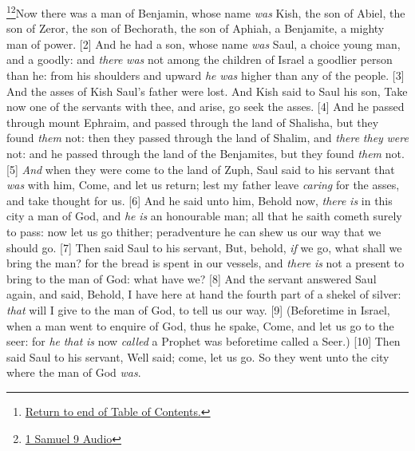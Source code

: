 \footnote{\textcolor[cmyk]{0.99998,1,0,0}{\hyperlink{TOC}{Return to end of Table of Contents.}}}\footnote{\href{https://audiobible.com/bible/1_samuel_9.html}{\textcolor[cmyk]{0.99998,1,0,0}{1 Samuel 9 Audio}}}\textcolor[cmyk]{0.99998,1,0,0}{Now there was a man of Benjamin, whose name \emph{was} Kish, the son of Abiel, the son of Zeror, the son of Bechorath, the son of Aphiah, a Benjamite, a mighty man of power.}
[2] \textcolor[cmyk]{0.99998,1,0,0}{And he had a son, whose name \emph{was} Saul, a choice young man, and a goodly: and \emph{there} \emph{was} not among the children of Israel a goodlier person than he: from his shoulders and upward \emph{he} \emph{was} higher than any of the people.}
[3] \textcolor[cmyk]{0.99998,1,0,0}{And the asses of Kish Saul's father were lost. And Kish said to Saul his son, Take now one of the servants with thee, and arise, go seek the asses.}
[4] \textcolor[cmyk]{0.99998,1,0,0}{And he passed through mount Ephraim, and passed through the land of Shalisha, but they found \emph{them} not: then they passed through the land of Shalim, and \emph{there} \emph{they} \emph{were} not: and he passed through the land of the Benjamites, but they found \emph{them} not.}
[5] \textcolor[cmyk]{0.99998,1,0,0}{\emph{And} when they were come to the land of Zuph, Saul said to his servant that \emph{was} with him, Come, and let us return; lest my father leave \emph{caring} for the asses, and take thought for us.}
[6] \textcolor[cmyk]{0.99998,1,0,0}{And he said unto him, Behold now, \emph{there} \emph{is} in this city a man of God, and \emph{he} \emph{is} an honourable man; all that he saith cometh surely to pass: now let us go thither; peradventure he can shew us our way that we should go.}
[7] \textcolor[cmyk]{0.99998,1,0,0}{Then said Saul to his servant, But, behold, \emph{if} we go, what shall we bring the man? for the bread is spent in our vessels, and \emph{there} \emph{is} not a present to bring to the man of God: what have we?}
[8] \textcolor[cmyk]{0.99998,1,0,0}{And the servant answered Saul again, and said, Behold, I have here at hand the fourth part of a shekel of silver: \emph{that} will I give to the man of God, to tell us our way.}
[9] \textcolor[cmyk]{0.99998,1,0,0}{(Beforetime in Israel, when a man went to enquire of God, thus he spake, Come, and let us go to the seer: for \emph{he} \emph{that} \emph{is} now \emph{called} a Prophet was beforetime called a Seer.)}
[10] \textcolor[cmyk]{0.99998,1,0,0}{Then said Saul to his servant, Well said; come, let us go. So they went unto the city where the man of God \emph{was}.}\\
